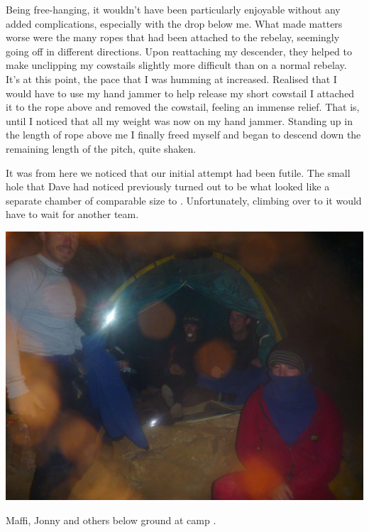 Being free-hanging, it wouldn't
have been particularly enjoyable without any added complications,
especially with the drop below me. What made matters worse were the many
ropes that had been attached to the rebelay, seemingly going off in
different directions. Upon reattaching my descender, they helped to make
unclipping my cowstails slightly more difficult than on a normal
rebelay. It's at this point, the pace that I was humming  at increased. Realised that I would have to use my hand
jammer to help release my short cowstail I attached it to the rope above
and removed the cowstail, feeling an immense relief. That is, until I
noticed that all my weight was now on my hand jammer. Standing up in the
length of rope above me I finally freed myself and began to descend down
the remaining length of the pitch, quite shaken.


It was from here we
noticed that our initial attempt had been futile. The small hole that
Dave had noticed previously turned out to be what looked like a separate
chamber of comparable size to . Unfortunately, climbing over to it
would have to wait for another team.

\begin{pagefigure}
\checkoddpage \ifoddpage \forcerectofloat \else \forceversofloat \fi
   \centering
\includegraphics[width = \textwidth]{2011/alex_pitcher_award/2011-08-03-09.45.02-Grega-Panasonc DMC-FT2-104-camp x-ray--orig.jpg}
\caption{Maffi, Jonny and others below ground at camp . } \label{jonny x-ray}
\end{pagefigure}

